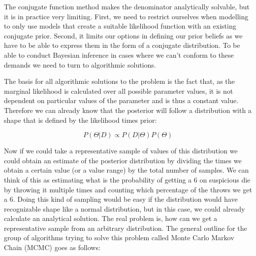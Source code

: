 \documentclass[12pt,a4paper,leqno]{report}
\theoremstyle{plain}
\theoremstyle{definition}
\theoremstyle{remark}
\begin{document}
The conjugate function method makes the denominator analytically solvable, but it
is in practice very limiting. First, we need to restrict ourselves when
modelling to only use models that create a suitable likelihood function with an existing
conjugate prior. Second, it limits our options in defining our prior
beliefs as we have to be able to express them in the form of a conjugate distribution. To
be able to conduct Bayesian inference in cases where we can't conform to these demands we need
to turn to algorithmic solutions.

The basis for all algorithmic solutions to the problem is the fact that,
as the marginal likelihood is calculated over all possible parameter values, it is
not dependent on particular values of the parameter and is thus a constant value.
Therefore we can already know that the posterior will follow a distribution
with a shape that is defined by the likelihood times prior:

\begin{def}\label{bayespropto}
    \begin{equation}
        P(\Theta|D) \propto P(D|\Theta)P(\Theta)
    \end{equation}
\end{def}

Now if we could take a representative sample of values of this distribution we could
obtain an estimate of the posterior distribution by dividing the times we obtain a
certain value (or a value range) by the total number of samples. We can think of this
as estimating what is the probability of getting a 6 on
suspicious die by throwing it multiple times and counting which percentage of the
throws we get a 6. Doing this kind of sampling would be easy if the distribution would have
recognizable shape like a normal distribution, but in this case, we could already calculate an analytical
solution. The real problem is, how can we get a representative sample from an arbitrary
distribution. The general outline for the group of algorithms trying to solve this problem called
Monte Carlo Markov Chain (MCMC) goes as follows:
\end{document}
